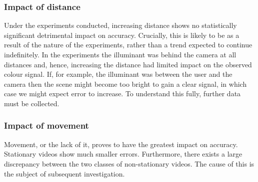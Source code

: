 \subsubsection{Impact of distance}
Under the experiments conducted, increasing distance shows no statistically significant detrimental impact on accuracy.
Crucially, this is likely to be as a result of the nature of the experiments, rather than a trend expected to continue indefinitely.
In the experiments the illuminant was behind the camera at all distances and, hence, increasing the distance had limited impact on the observed colour signal.
If, for example, the illuminant was between the user and the camera then the scene might become too bright to gain a clear signal, in which case we might expect error to increase.
To understand this fully, further data must be collected.
\begin{figure}[H]
    \centering
    \quad
    \quad
\end{figure}

\subsubsection{Impact of movement}
Movement, or the lack of it, proves to have the greatest impact on accuracy. Stationary videos show much smaller errors. Furthermore, there exists a large discrepancy between the two classes of non-stationary videos. The cause of this is the subject of subsequent investigation.

